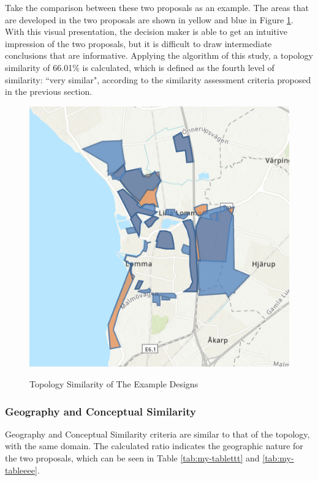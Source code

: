 Take the comparison between these two proposals as an example. The areas that are developed in the two proposals are shown in yellow and blue in Figure \ref{eva_topo_example}. With this visual presentation, the decision maker is able to get an intuitive impression of the two proposals, but it is difficult to draw intermediate conclusions that are informative. Applying the algorithm of this study, a topology similarity of 66.01\% is calculated, which is defined as the fourth level of similarity: ``very similar", according to the similarity assessment criteria proposed in the previous section.




\begin{figure}[H]
\caption{Topology Similarity of The Example Designs}
\centering
\includegraphics[scale=0.5]{pic4.png}
\label{eva_topo_example}
\end{figure}

\subsubsection*{Geography and Conceptual Similarity}
Geography and Conceptual Similarity criteria are similar to that of the topology, with the same domain. The calculated ratio indicates the geographic nature for the two proposals, which can be seen in Table \ref{tab:my-tablettt} and \ref{tab:my-tableeee}.

